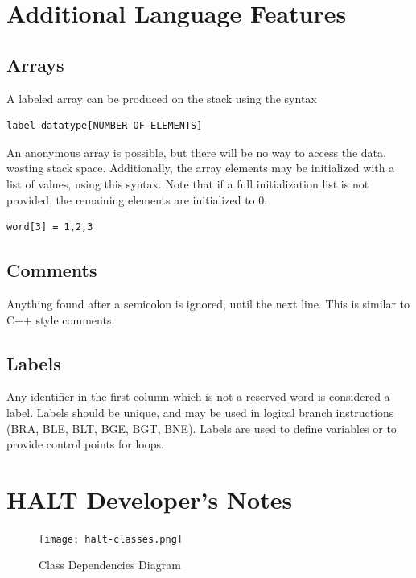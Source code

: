 \documentclass[10pt,fullpage]{article}
\begin{document}
\section*{Additional Language Features}

\subsection*{Arrays}
A labeled array can be produced on the stack using the syntax
\begin{verbatim}label datatype[NUMBER OF ELEMENTS]\end{verbatim}
An anonymous array is possible, but there will be no way to access
the data, wasting stack space. Additionally, the array elements may
be initialized with a list of values, using this syntax. Note that
if a full initialization list is not provided, the remaining
elements are initialized to 0.
\begin{verbatim}word[3] = 1,2,3\end{verbatim}

\subsection*{Comments}
Anything found after a semicolon is ignored, until the next line.
This is similar to C++ style comments.

\subsection*{Labels}
Any identifier in the first column which is not a reserved word is
considered a label. Labels should be unique, and may be used in
logical branch instructions (BRA, BLE, BLT, BGE, BGT, BNE). Labels
are used to define variables or to provide control points for loops.

\section*{HALT Developer's Notes}
\begin{figure}[hp]
  \begin{center}
    \texttt{[image: halt-classes.png]}
    \caption{Class Dependencies Diagram}
  \end{center}
\end{figure}
\end{document}
